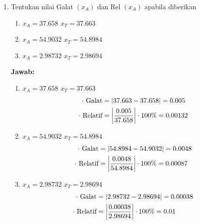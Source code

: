 \documentclass[fleqn]{article}
\begin{document}
\begin{enumerate}
		\item Tentukan nilai Galat $(x_A)$ dan Rel $(x_A)$ apabila diberikan 
			\begin{enumerate}[label=\alph*)]
				\item $x_A=37.658$  $x_T = 37.663$
				\item $x_A=54.9032$  $x_T = 54.8984$
				\item $x_A=2.98732$  $x_T = 2.98694$
			\end{enumerate}
			\textbf{Jawab: }
			\begin{enumerate}[label=\alph*)]
				\item $x_A=37.658$  $x_T = 37.663$
					\begin{align*}
						\cdot \text{ Galat} &= \abs{ 37.663-37.658 } = 0.005 \\
						\cdot \text{ Relatif} &= \abs{ \frac{0.005}{37.658} } \cdot 100\% = 0.00132 \\
					\end{align*}
				\item $x_A=54.9032$  $x_T = 54.8984$
					\begin{align*}
						\cdot \text{ Galat} &= \abs{ 54.8984 - 54.9032 } = 0.0048 \\
						\cdot \text{ Relatif} &= \abs{ \frac{0.0048}{54.8984} } \cdot 100\% = 0.00087 \\
					\end{align*}
				\item $x_A=2.98732$  $x_T = 2.98694$
					\begin{align*}
						\cdot \text{ Galat} &= \abs{ 2.98732 - 2.98694 } = 0.00038 \\
						\cdot \text{ Relatif} &= \abs{ \frac{0.00038}{2.98694} } \cdot 100\% = 0.01 
					\end{align*}
			\end{enumerate}


\end{enumerate}
\end{document}
